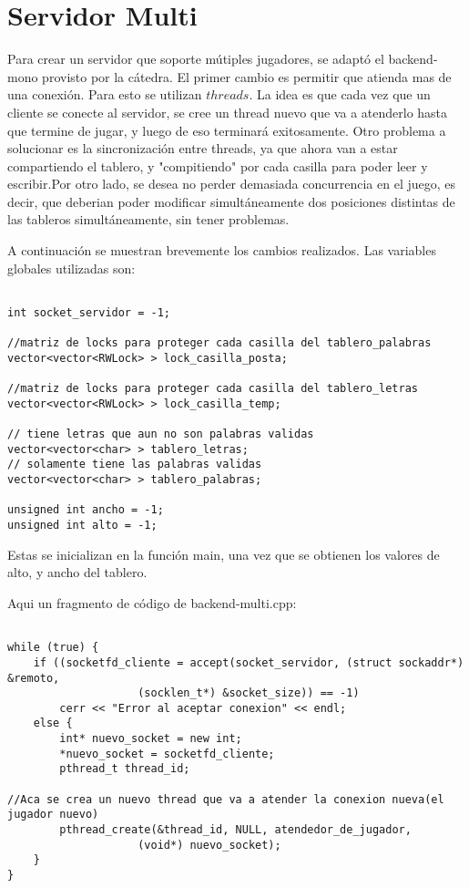 \section{Servidor Multi}

Para crear un servidor que soporte mútiples jugadores, se adaptó el backend-mono provisto por la cátedra.
El primer cambio es permitir que atienda mas de una conexión. Para esto se utilizan $threads$. La idea es que cada vez que un cliente se conecte al servidor,
se cree un thread nuevo que va a atenderlo hasta que termine de jugar, y luego de eso terminará exitosamente. 
Otro problema a solucionar es la sincronización entre threads, ya que ahora van a estar compartiendo el tablero, y "compitiendo" por cada casilla para
poder leer y escribir.Por otro lado, se desea no perder demasiada concurrencia en el juego, es decir, que deberian poder modificar simultáneamente dos posiciones
distintas de las tableros simultáneamente, sin tener problemas.  

A continuación se muestran brevemente los cambios realizados.
Las variables globales utilizadas son:
\begin{lstlisting}

int socket_servidor = -1;

//matriz de locks para proteger cada casilla del tablero_palabras
vector<vector<RWLock> > lock_casilla_posta;	

//matriz de locks para proteger cada casilla del tablero_letras
vector<vector<RWLock> > lock_casilla_temp;	

// tiene letras que aun no son palabras validas
vector<vector<char> > tablero_letras; 		
// solamente tiene las palabras validas
vector<vector<char> > tablero_palabras;		

unsigned int ancho = -1;
unsigned int alto = -1;
\end{lstlisting}
Estas se inicializan en la función main, una vez que se obtienen los valores de alto, y ancho del tablero. 


Aqui un fragmento de código de backend-multi.cpp:

\begin{lstlisting}

while (true) {
    if ((socketfd_cliente = accept(socket_servidor, (struct sockaddr*) &remoto,
					(socklen_t*) &socket_size)) == -1)
        cerr << "Error al aceptar conexion" << endl;
    else {
		int* nuevo_socket = new int;
		*nuevo_socket = socketfd_cliente;
		pthread_t thread_id;	
			
//Aca se crea un nuevo thread que va a atender la conexion nueva(el jugador nuevo)
		pthread_create(&thread_id, NULL, atendedor_de_jugador,
					(void*) nuevo_socket);
    }
}
\end{lstlisting}
\\

